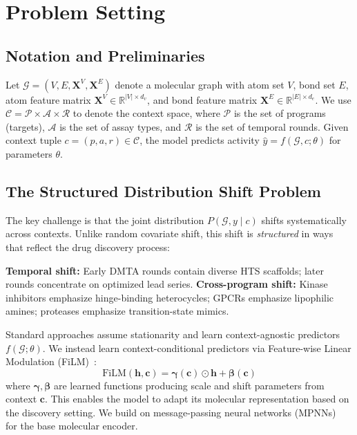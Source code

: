 \documentclass[sigconf]{acmart}
\newcommand{\film}{\text{FiLM}}
\begin{document}
\section{Problem Setting}
\label{sec:problem}

\subsection{Notation and Preliminaries}

Let $\mathcal{G} = (V, E, \mathbf{X}^V, \mathbf{X}^E)$ denote a molecular graph with atom set $V$, bond set $E$, atom feature matrix $\mathbf{X}^V \in \mathbb{R}^{|V| \times d_v}$, and bond feature matrix $\mathbf{X}^E \in \mathbb{R}^{|E| \times d_e}$. We use $\mathcal{C} = \mathcal{P} \times \mathcal{A} \times \mathcal{R}$ to denote the context space, where $\mathcal{P}$ is the set of programs (targets), $\mathcal{A}$ is the set of assay types, and $\mathcal{R}$ is the set of temporal rounds. Given context tuple $c = (p, a, r) \in \mathcal{C}$, the model predicts activity $\hat{y} = f(\mathcal{G}, c; \theta)$ for parameters $\theta$.

\subsection{The Structured Distribution Shift Problem}

The key challenge is that the joint distribution $P(\mathcal{G}, y \mid c)$ shifts systematically across contexts. Unlike random covariate shift, this shift is \textit{structured} in ways that reflect the drug discovery process:

\textbf{Temporal shift:} Early DMTA rounds contain diverse HTS scaffolds; later rounds concentrate on optimized lead series. \textbf{Cross-program shift:} Kinase inhibitors emphasize hinge-binding heterocycles; GPCRs emphasize lipophilic amines; proteases emphasize transition-state mimics.

Standard approaches assume stationarity and learn context-agnostic predictors $f(\mathcal{G}; \theta)$. We instead learn context-conditional predictors via Feature-wise Linear Modulation (FiLM)~\cite{perez_2018_film}:
\begin{equation}
    \film(\mathbf{h}, \mathbf{c}) = \boldsymbol{\gamma}(\mathbf{c}) \odot \mathbf{h} + \boldsymbol{\beta}(\mathbf{c})
\end{equation}
where $\boldsymbol{\gamma}, \boldsymbol{\beta}$ are learned functions producing scale and shift parameters from context $\mathbf{c}$. This enables the model to adapt its molecular representation based on the discovery setting. We build on message-passing neural networks (MPNNs)~\cite{gilmer_2017_mpnn} for the base molecular encoder.
\end{document}
